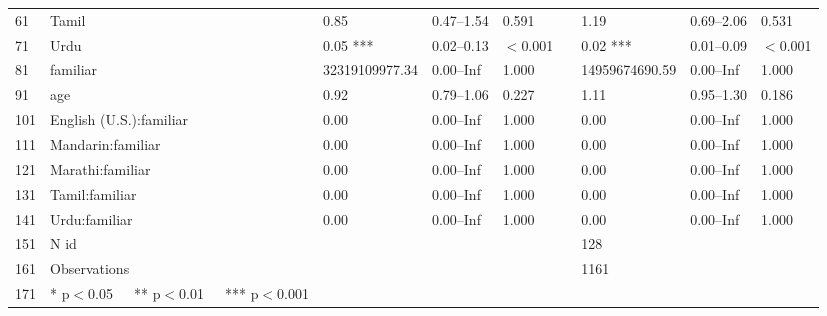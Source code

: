 \begin{table}[ht]
\begin{tabular}{}
  61 & Tamil & 0.85 & 0.47--1.54 & 0.591 &  & 1.19 & 0.69--2.06 & 0.531 \\ 
  71 & Urdu & 0.05 *** & 0.02--0.13 & $<$0.001 &  & 0.02 *** & 0.01--0.09 & $<$0.001 \\ 
  81 & familiar & 32319109977.34 & 0.00--Inf & 1.000 &  & 14959674690.59 & 0.00--Inf & 1.000 \\ 
  91 & age & 0.92 & 0.79--1.06 & 0.227 &  & 1.11 & 0.95--1.30 & 0.186 \\ 
  101 & English (U.S.):familiar & 0.00 & 0.00--Inf & 1.000 &  & 0.00 & 0.00--Inf & 1.000 \\ 
  111 & Mandarin:familiar & 0.00 & 0.00--Inf & 1.000 &  & 0.00 & 0.00--Inf & 1.000 \\ 
  121 & Marathi:familiar & 0.00 & 0.00--Inf & 1.000 &  & 0.00 & 0.00--Inf & 1.000 \\ 
  131 & Tamil:familiar & 0.00 & 0.00--Inf & 1.000 &  & 0.00 & 0.00--Inf & 1.000 \\ 
  141 & Urdu:familiar & 0.00 & 0.00--Inf & 1.000 &  & 0.00 & 0.00--Inf & 1.000 \\ 
  151 & N id &  &  &  &  & 128 &  &  \\ 
  161 & Observations &  &  &  &  & 1161 &  &  \\ 
  171 & * p$<$0.05   ** p$<$0.01   *** p$<$0.001 &  &  &  &  &  &  &  \\ 
   \hline
\end{tabular}
\end{table}
